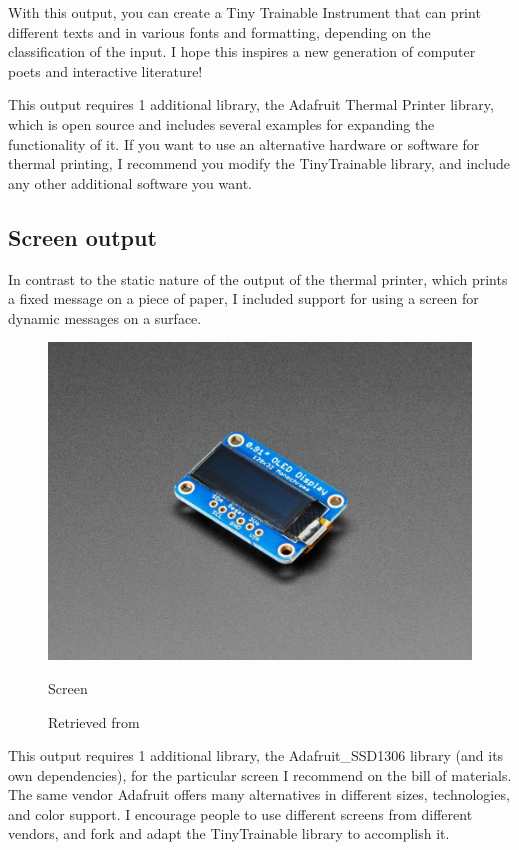 With this output, you can create a Tiny Trainable Instrument that can print different texts and in various fonts and formatting, depending on the classification of the input. I hope this inspires a new generation of computer poets and interactive literature!

This output requires 1 additional library, the Adafruit Thermal Printer library, which is open source and includes several examples for expanding the functionality of it. If you want to use an alternative hardware or software for thermal printing, I recommend you modify the TinyTrainable library, and include any other additional software you want.

\subsection{Screen output}

In contrast to the static nature of the output of the thermal printer, which prints a fixed message on a piece of paper, I included support for using a screen for dynamic messages on a surface. 

\begin{figure}[ht]
  \centering
  \includegraphics[width=0.75\linewidth,height=0.25\textheight,keepaspectratio]{images/materials-adafruit-screen.jpg}
  \caption{Screen}
  \caption*{Retrieved from \cite{website-materials-adafruit-screen}}
  \label{fig:materials-adafruit-screen}
\end{figure}

This output requires 1 additional library, the Adafruit{\_}SSD1306 library (and its own dependencies), for the particular screen I recommend on the bill of materials. The same vendor Adafruit offers many alternatives in different sizes, technologies, and color support. I encourage people to use different screens from different vendors, and \gls{fork} and adapt the TinyTrainable library to accomplish it.


